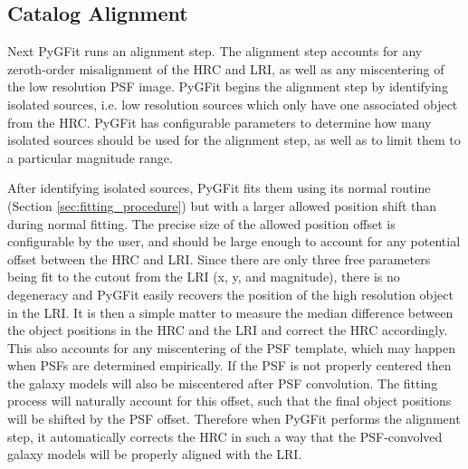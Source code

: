 \documentclass[preprint]{aastex}
\newcommand{\pygfit}{PyGFit}
\begin{document}
\subsection{Catalog Alignment}\label{sec:alignment}

Next \pygfit{} runs an alignment step.  The alignment step accounts for any zeroth-order misalignment of the HRC and LRI, as well as any miscentering of the low resolution PSF image.  \pygfit{} begins the alignment step by identifying isolated sources, i.e. low resolution sources which only have one associated object from the HRC.  \pygfit{} has configurable parameters to determine how many isolated sources should be used for the alignment step, as well as to limit them to a particular magnitude range.

After identifying isolated sources, \pygfit{} fits them using its normal routine (Section \ref{sec:fitting_procedure}) but with a larger allowed position shift than during normal fitting.  The precise size of the allowed position offset is configurable by the user, and should be large enough to account for any potential offset between the HRC and LRI.  Since there are only three free parameters being fit to the cutout from the LRI (x, y, and magnitude), there is no degeneracy and \pygfit{} easily recovers the position of the high resolution object in the LRI.  It is then a simple matter to measure the median difference between the object positions in the HRC and the LRI and correct the HRC accordingly.  This also accounts for any miscentering of the PSF template, which may happen when PSFs are determined empirically. If the PSF is not properly centered then the galaxy models will also be miscentered after PSF convolution.  The fitting process will naturally account for this offset, such that the final object positions will be shifted by the PSF offset.  Therefore when \pygfit{} performs the alignment step, it automatically corrects the HRC in such a way that the PSF-convolved galaxy models will be properly aligned with the LRI.

\end{document}

